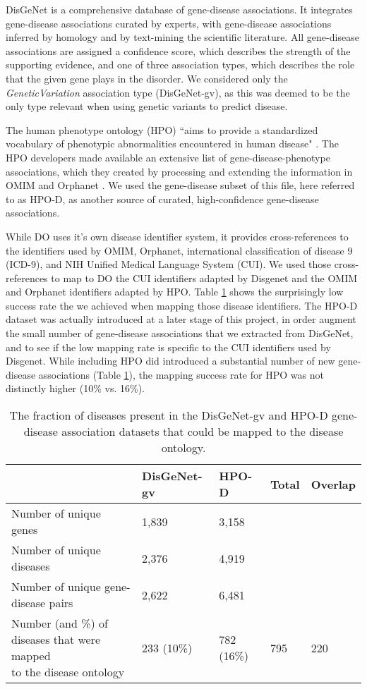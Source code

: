 \documentclass[11pt]{article}
\begin{document}
DisGeNet \cite{Bauer-Mehren2010} is a comprehensive database of gene-disease associations. It integrates gene-disease associations curated by experts, with gene-disease associations inferred by homology and by text-mining the scientific literature. All gene-disease associations are assigned a confidence score, which describes the strength of the supporting evidence, and one of three association types, which describes the role that the given gene plays in the disorder. We considered only the  \textit{GeneticVariation} association type (DisGeNet-gv), as this was deemed to be the only type relevant when using genetic variants to predict disease.

The human phenotype ontology (HPO) ``aims to provide a standardized vocabulary of phenotypic abnormalities encountered in human disease" \cite{Kohler2013}. The HPO developers made available an extensive list of gene-disease-phenotype associations, which they created by processing and extending the information in OMIM \cite{Hamosh2005} and Orphanet \cite{Rath2012}. We used the gene-disease subset of this file, here referred to as HPO-D, as another source of curated, high-confidence gene-disease associations.

While DO uses it's own disease identifier system, it provides cross-references to the identifiers used by OMIM, Orphanet, international classification of disease 9 (ICD-9), and NIH Unified Medical Language System (CUI). We used those cross-references to map to DO the CUI identifiers adapted by Disgenet and the OMIM and Orphanet identifiers adapted by HPO. Table \ref{tab:gene2disease} shows the surprisingly low success rate the we achieved when mapping those disease identifiers. The HPO-D dataset was actually introduced at a later stage of this project, in order augment the small number of gene-disease associations that we extracted from DisGeNet, and to see if the low mapping rate is specific to the CUI identifiers used by Disgenet. While including HPO did introduced a substantial number of new gene-disease associations (Table \ref{tab:gene2disease}), the mapping success rate for HPO was not distinctly higher (10\% vs. 16\%).


\begin{table} %
\caption{The fraction of diseases present in the DisGeNet-gv and HPO-D gene-disease association datasets that could be mapped to the disease ontology.}
\label{tab:gene2disease}
\centering
\begin{tabular}{l|llll} \toprule
&  DisGeNet-gv & HPO-D & Total & Overlap \\ \midrule
Number of unique genes & 1,839 & 3,158 & & \\
Number of unique diseases & 2,376 & 4,919 & & \\
Number of unique gene-disease pairs & 2,622 & 6,481 & & \\
\pbox{20cm}{Number (and \%) of diseases that were mapped\\
to the disease ontology} 
& 233 (10\%) & 782 (16\%) & 795 & 220 \\
\bottomrule
\end{tabular}
\end{table}
\end{document}
